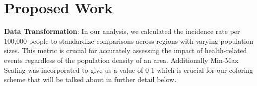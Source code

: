 \documentclass[sigconf,screen,nonacm]{acmart}
\begin{document}
\section{Proposed Work}

\textbf{Data Transformation}: In our analysis, we calculated the incidence rate per 100,000 people to standardize comparisons across regions with varying population sizes. This metric is crucial for accurately assessing the impact of health-related events regardless of the population density of an area. Additionally Min-Max Scaling was incorporated to give us a value of 0-1 which is crucial for our coloring scheme that will be talked about in further detail below. 
\end{document}
